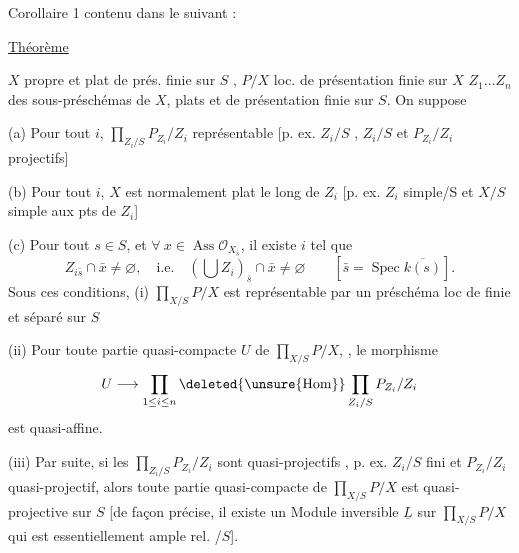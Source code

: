Corollaire 1  contenu dans le suivant :

\uline{Théorème}

$X$ propre et plat de prés. finie sur $S$ ,
$P/X$ loc. de présentation finie sur $X$
$Z_1\ldots Z_n$ des sous-préschémas  de $X$, plats et de présentation finie
sur $S$. On suppose

(a) Pour tout $i$, $\displaystyle\prod_{Z_i/S}P_{Z_i}/Z_i$ représentable
[p. ex. $Z_i/S$ , 
$Z_i/S$ et $P_{Z_i}/Z_i$ projectifs]

(b) Pour tout $i$, $X$ est normalement plat le long de $Z_i$
[p. ex. $Z_i$ simple/S et $X/S$ simple aux pts de $Z_i$]

(c) Pour tout $s\in S$, et $\forall\ x\in\operatorname{Ass}\mathcal{O}_{X_{\bar s}}$, il existe $i$ tel que
\[
Z_{i\bar s}\cap\bar x\ne\varnothing,\quad\text{i.e.}\quad
(\bigcup Z_i)_{\bar s}\cap\bar x\ne\varnothing\qquad[\bar s=\operatorname{Spec}\overline{k(s)}].
\]
Sous ces conditions, (i) $\displaystyle\prod_{X/S}P/X$ est représentable
par un préschéma loc de   finie et séparé sur $S$

 (ii) Pour toute partie  quasi-compacte $U$ de
$\displaystyle\prod_{X/S}P/X$, ,
le morphisme
\[
U\longrightarrow\prod_{1\leq i\leq n}\deleted{\unsure{\operatorname{Hom}}}\prod_{Z_i/S}P_{Z_i}/Z_i
\]
est quasi-affine.

(iii) Par suite, si les
$\displaystyle\prod_{Z_i/S}P_{Z_i}/Z_i$ sont quasi-projectifs  ,
p. ex. $Z_i/S$ fini et $P_{Z_i}/Z_i$
quasi-projectif, alors toute partie quasi-compacte de
$\displaystyle\prod_{X/S}P/X$ est quasi-projective sur $S$ [de façon précise, il
existe un Module inversible $\underline L$ sur $\displaystyle\prod_{X/S}P/X$ qui est
essentiellement ample rel. /$S$].
